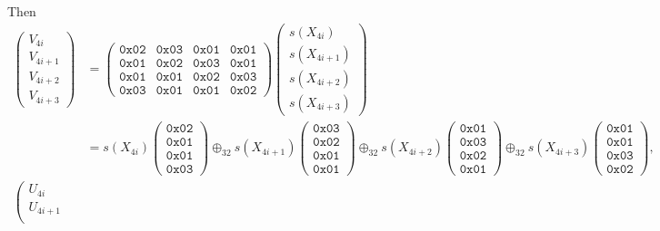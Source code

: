 Then \begin{align*}
\left(\begin{array}{l}
	V_{4i} \\
	V_{4i+1} \\
	V_{4i+2} \\
	V_{4i+3}
\end{array}\right)&=\begin{pmatrix}
	\texttt{0x02} & \texttt{0x03} & \texttt{0x01} & \texttt{0x01}\\
	\texttt{0x01} & \texttt{0x02} & \texttt{0x03} & \texttt{0x01}\\
	\texttt{0x01} & \texttt{0x01} & \texttt{0x02} & \texttt{0x03}\\
	\texttt{0x03} & \texttt{0x01} & \texttt{0x01} & \texttt{0x02}
\end{pmatrix}\left(\begin{array}{l}
s(X_{4i})\\
s(X_{4i+1})\\
s(X_{4i+2})\\
s(X_{4i+3})
\end{array}\right)\\
&=s(X_{4i})\begin{pmatrix}
	\texttt{0x02}\\
	\texttt{0x01}\\
	\texttt{0x01}\\
	\texttt{0x03}
\end{pmatrix}\oplus_{32} s(X_{4i+1})\begin{pmatrix}
\texttt{0x03}\\
\texttt{0x02}\\
\texttt{0x01}\\
\texttt{0x01}
\end{pmatrix}\oplus_{32} s(X_{4i+2})\begin{pmatrix}
\texttt{0x01}\\
\texttt{0x03}\\
\texttt{0x02}\\
\texttt{0x01}
\end{pmatrix}\oplus_{32} s(X_{4i+3})\begin{pmatrix}
\texttt{0x01}\\
\texttt{0x01}\\
\texttt{0x03}\\
\texttt{0x02}
\end{pmatrix},\\
\left(\begin{array}{l}
	U_{4i} \\
	U_{4i+1} \\

\end{array}
\end{align*}

